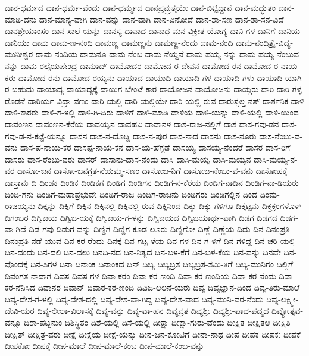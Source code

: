 ದಾನ-ಧರ್ಮದ
ದಾನ-ಧರ್ಮ-ವೆಂದು
ದಾನ-ಧರ್ಮ್ಮದ
ದಾನಪ್ರವ್ರುತ್ತಯೇ
ದಾನ-ಬಿಟ್ಟಿದ್ದಾನೆ
ದಾನ-ಮದ್ಭುತಂ
ದಾನ-ಮಾಡಿ-ದನು
ದಾನ-ಮಾನ್ಯ-ವಾಗಿ
ದಾನ-ವನ್ನು
ದಾನ-ವಾಗಿ
ದಾನ-ವಿನೋದೆ
ದಾನ-ಶಾ-ಸಣ
ದಾನ-ಶಾ-ಸನ-ವಿದೆ
ದಾನಶ್ರೇಯಾಂಸಂ
ದಾನ-ಸಾಲೆ-ಯನ್ನು
ದಾನಸ್ಯ
ದಾನಾದ
ದಾನಾಧ-ಮನ-ವಿಕ್ರೀತ-ಯೋಗ್ಯ
ದಾನಿ-ಗಳ
ದಾನಿಗೆ
ದಾನಿಯ
ದಾನಿಯು
ದಾಮ
ದಾಮ-ಣ-ನಂದಿ
ದಾಮಣ್ಣ
ದಾಮಣ್ಣನು
ದಾಮಣ್ಣ-ನೆಂದು
ದಾಮ-ನಂದಿ
ದಾಮ-ನಂದಿತ್ರೈ-ವಿದ್ಯ-ಮುನೀಶ್ವರ
ದಾಮ-ನಂದಿಯ
ದಾಮನೂ
ದಾಮ-ನೆಂಬ
ದಾಮ-ನೆಯ್ದನೆ
ದಾಮ-ಪಯ್ಯ-ನನ್ನು
ದಾಮ-ಪಯ್ಯ-ನೆಂಬುವ-ನನ್ನು
ದಾಮ-ರಲೈಯಪೇಂದ್ರ
ದಾಮಾದ್
ದಾಮೋದರ
ದಾಮೋದ-ರ-ದೇವನ
ದಾಮೋದ-ರನ
ದಾಮೋದ-ರ-ನಾಯ-ಕರು
ದಾಮೋದ-ರನು
ದಾಮೋದ-ರಯ್ಯನು
ದಾಯಾದ
ದಾಯಾದಿ
ದಾಯಾದಿ-ಗಳ
ದಾಯಾದಿ-ಗಳು
ದಾಯಾದಿ-ಯಾಗಿ-ರ-ಬಹುದು
ದಾಯಾದ್ಯ
ದಾಯಾದ್ಯಕ್ಕೆ
ದಾಯಿಗ-ಬೇಂಟೆ-ಕಾರ
ದಾಯೋಜನ
ದಾಯೋಜನು
ದಾಯ್ಗರು
ದಾರಿ
ದಾರಿ-ಗಳ್ಳ-ರೊಡನೆ
ದಾರಿರ್ಯ-ವಿದ್ರಾ-ವಣಂ
ದಾರಿ-ಯಲ್ಲಿ
ದಾರಿ-ಯಲ್ಲಿಯೇ
ದಾರಿ-ಯಲ್ಲಿ-ರುವ
ದಾರುಸ್ಸಲ್ತ-ನತ್
ದಾರ್ಶನಿಕ
ದಾಳಿ
ದಾಳಿ-ಕಾರರು
ದಾಳಿ-ಗ-ಳಲ್ಲಿ
ದಾಳಿ-ಗಿ-ದಿರು
ದಾಳಿಗೆ
ದಾಳಿ-ಮಾಡಿ
ದಾಳಿಯ
ದಾಳಿ-ಯನ್ನು
ದಾಳಿ-ಯಲ್ಲಿ
ದಾಳಿ-ಯಿಂದ
ದಾವಂಣನ
ದಾವಂಣನ-ಕೆರೆಯ
ದಾವಯ್ಯನ
ದಾವಹವಿ
ದಾವಾನಳ
ದಾಶ-ರಾಜ-ನಲ್ಲಿಗೆ
ದಾಸ
ದಾಸ-ಗವು-ಡನ
ದಾಸ-ಗವು-ಡ-ನ-ಕಟ್ಟೆ-ಯನ್ನೂ
ದಾಸನ
ದಾಸ-ನ-ದೊಡ್ಡಿ
ದಾಸ-ನ-ಪುರ
ದಾಸ-ನಾದ
ದಾಸನು
ದಾಸ-ನೂರು
ದಾಸ-ನೆಂಬು-ವ-ವನು
ದಾಸ-ಪ-ನಾಯ-ಕರ
ದಾಸಪ್ಪ-ನಾಯ-ಕನ
ದಾಸ-ಯ-ಹೆಗ್ಗಡೆ
ದಾಸಯ್ಯ
ದಾಸಯ್ಯ-ನೆಂದರೆ
ದಾಸರ
ದಾಸ-ರಿಗೆ
ದಾಸರು
ದಾಸ-ರೆಂಬು-ವರು
ದಾಸರ್
ದಾಸಾನು-ದಾಸ-ನೆಂದು
ದಾಸಿ
ದಾಸಿ-ಮಯ್ಯ
ದಾಸಿ-ಮಯ್ಯನ
ದಾಸಿ-ಮಯ್ಯ-ನ-ವರ
ದಾಸೋ-ಜನ
ದಾಸೋ-ಜನಗ್ರತ-ನೆಯಮ್ಮ-ಸಣಂ
ದಾಸೋಜ-ನಿಗೆ
ದಾಸೋಜ-ನೆಂಬು-ವ-ವನು
ದಾಸೋಹಕ್ಕೆ
ದಾಸ್ತಾನು
ದಿ
ದಿಂಡಕ
ದಿಂಡಿಕ
ದಿಂಡಿಕಗ
ದಿಂಡಿಗ
ದಿಂಡಿಗನ
ದಿಂಡಿಗ-ನ-ಕೆರೆಯ
ದಿಂಡಿಗ-ನಾಡಿನ
ದಿಂಡಿಗ-ನಾ-ಡಿಯರು
ದಿಂಡಿ-ಗನು
ದಿಂಡಿಗ-ಮಹಾಪ್ರಭುವೇ
ದಿಂಡಿಗ-ರಾಜ
ದಿಂಡಿಗ-ರಾಜನು
ದಿಂಡಿಗರು
ದಿಂಡಿಗಲ್ಲಿನ
ದಿಂದ
ದಿಂಮ-ರಾಜಯ್ಯನು
ದಿಕ್ಕನ್ನು
ದಿಕ್ಕಿಗೆ
ದಿಕ್ಕಿನ
ದಿಕ್ಕಿನಲ್ಲಿ
ದಿಕ್ಕಿನಲ್ಲಿ-ರುವ
ದಿಕ್ಕಿನಿಂದ
ದಿಕ್ಕು
ದಿಕ್ಕು-ಗಳಿಗೂ
ದಿಕ್ಕೆಟ್ಟನು
ದಿಕ್ಚಕ್ರಂಗಳೊಳ್
ದಿಗಂಬರ
ದಿಗ್ವಿಜಯ
ದಿಗ್ವಿಜ-ಯಕ್ಕೆ
ದಿಗ್ವಿಜಯ-ಗ-ಳನ್ನು
ದಿಗ್ವಿಜಯದ
ದಿಗ್ವಿಜಯಾರ್ಥ-ವಾಗಿ
ದಿಡಗ
ದಿಡಗದ
ದಿಡಗ-ವಾ-ಗಿದೆ
ದಿಡ-ಗವು
ದಿಡುಗ-ವನ್ನು
ದಿಣ್ಡಿಗ
ದಿಣ್ಡಿಗ-ಕೂಡ-ಲೂರು
ದಿಣ್ಡಿಗೋ
ದಿಣ್ಣೆ
ದಿಣ್ಣೆಯ
ದಿದು
ದಿನ
ದಿನಂಪ್ರತಿ
ದಿನಂಪ್ರತಿ-ನಡೆ-ಯುವ
ದಿನ-ಕರ-ರೆಂದು
ದಿನಕ್ಕೆ
ದಿನ-ಗಟ್ಟ-ಳೆಯ
ದಿನ-ಗಳ
ದಿನ-ಗ-ಳಿಗೆ
ದಿನ-ಗಳಿದ್ದ
ದಿನ-ಚರಿ-ಯಲ್ಲಿ
ದಿನ-ದಂದು
ದಿನ-ದಲಿ
ದಿನ-ದಲು
ದಿನದಿ-ನದ
ದಿನ-ನಿತ್ಯದ
ದಿನ-ಬಳ-ಕೆಗೆ
ದಿನ-ಬಳ-ಕೆಯ
ದಿನ-ವನ್ನು
ದಿನವೇ
ದಿನ-ವೊಂದಕ್ಕೆ
ದಿನ-ಸಿಗಳ
ದಿನಾ
ದಿನಾಂಕ
ದಿನಾಂಕದ
ದಿನ್
ದಿಬ್ಯ
ದಿಬ್ಯಬ್ರತ
ದಿಬ್ಯಬ್ರತ-ಸಮಿ-ತಿಗೆ
ದಿಬ್ಯ-ಮುನಿಗಂ
ದಿಲ್ಲಿಗೆ
ದಿವಂಗತ-ನಾದಾಗ
ದಿವಸ
ದಿವಸ-ಗಳ
ದಿವಾ-ಕರಂ
ದಿವಾ-ಕರ-ಣಂದಿ
ದಿವಾ-ಕರ-ಣಂದಿಯ
ದಿವಾ-ಕರ-ನೆಂದು
ದಿವಾ-ಕರ-ನೆನಿಸಿದ
ದಿವಾನರ
ದಿವಾನ್
ದಿವಾರ-ಕರ-ಣಂದಿ
ದಿವಿಜ-ಲಲನೆ-ಯರು
ದಿವ್ಯ
ದಿವ್ಯಜ್ಞಾನ-ದಿಂದ
ದಿವ್ಯ-ತಿರು-ಮಾಲೆ
ದಿವ್ಯ-ದೇಶ-ಗ-ಳಲ್ಲಿ
ದಿವ್ಯ-ದೇಶ-ದಲ್ಲಿ
ದಿವ್ಯ-ದೇಶ-ವಾ-ಗಿದ್ದ
ದಿವ್ಯ-ದೇಶ-ವಾದ
ದಿವ್ಯ-ಮುನಿ-ವರ-ನೆಂದು
ದಿವ್ಯ-ಲಕ್ಷ್ಮೀ-ದೇವಿ-ಯರ
ದಿವ್ಯ-ಲೀಲಾ-ವಿಲಾಸಕ್ಕೆ
ದಿವ್ಯ-ವನ್ನು
ದಿವ್ಯ-ವಾ-ಹನ
ದಿವ್ಯವ್ರತ
ದಿವ್ಯಶ್ರೀ
ದಿವ್ಯಶ್ರೀ-ಪಾದ-ಪದ್ಮದ
ದಿವ್ಯೋತ್ಸವ-ವನ್ನೂ
ದಿಶಾ-ಪಟ್ಟನುಂ
ದಿಶಿಸ್ಥಿತಂ
ದಿಶೆ-ಯಲ್ಲಿ
ದಿಸೆ-ಯಲ್ಲಿ
ದೀಕ್ಷಾ
ದೀಕ್ಷಾ-ಗುರು-ವೆಂದು
ದೀಕ್ಷಿತ
ದೀಕ್ಷಿತಅ
ದೀಕ್ಷಿತಿ
ದೀಕ್ಷಿತ್
ದೀಕ್ಷಿತ್ರ-ವರು
ದೀಕ್ಷೆ
ದೀಕ್ಷೆಯ
ದೀಕ್ಷೆ-ಯನ್ನು
ದೀನ-ಜನ-ಕೋಟಿಗೆ
ದೀನಾ-ನಾಥ
ದೀಪ
ದೀಪಕ
ದೀಪಕಃ
ದೀಪಕೆ
ದೀಪಕೋ
ದೀಪಕ್ಕೆ
ದೀಪ-ಮಾಲೆ
ದೀಪ-ಮಾಲೆ-ಕಂಬ
ದೀಪ-ಮಾಲೆ-ಕಂಬ-ವನ್ನು
